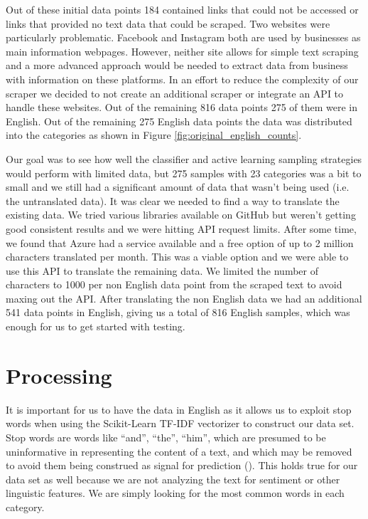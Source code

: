 Out of these initial data points 184 contained links that could not be accessed or links that provided no text data that could be scraped. Two websites were particularly problematic. Facebook and Instagram both are used by businesses as main information webpages. However, neither site allows for simple text scraping and a more advanced approach would be needed to extract data from business with information on these platforms. In an effort to reduce the complexity of our scraper we decided to not create an additional scraper or integrate an API to handle these websites. Out of the remaining 816 data points 275 of them were in English. Out of the remaining 275 English data points the data was distributed into the categories as shown in Figure \ref{fig:original_english_counts}.

Our goal was to see how well the classifier and active learning sampling strategies would perform with limited data, but 275 samples with 23 categories was a bit to small and we still had a significant amount of data that wasn't being used (i.e. the untranslated data). It was clear we needed to find a way to translate the existing data. We tried various libraries available on GitHub but weren't getting good consistent results and we were hitting API request limits. After some time, we found that Azure had a service available and a free option of up to 2 million characters translated per month. This was a viable option and we were able to use this API to translate the remaining data. We limited the number of characters to 1000 per non English data point from the scraped text to avoid maxing out the API. After translating the non English data we had an additional 541 data points in English, giving us a total of 816 English samples, which was enough for us to get started with testing.

\section{Processing}

It is important for us to have the data in English as it allows us to exploit stop words when using the Scikit-Learn TF-IDF vectorizer to construct our data set. Stop words are words like “and”, “the”, “him”, which are presumed to be uninformative in representing the content of a text, and which may be removed to avoid them being construed as signal for prediction (\cite{sklearn62feature}). This holds true for our data set as well because we are not analyzing the text for sentiment or other linguistic features. We are simply looking for the most common words in each category.

